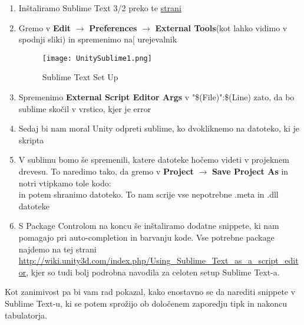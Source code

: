 \begin{enumerate}
	\item Inštaliramo Sublime Text 3/2 preko te \href{http://www.sublimetext.com/3}{strani}
	\item Gremo v \textbf{Edit} $\rightarrow$ \textbf{Preferences} $\rightarrow$ \textbf{External Tools}(kot lahko vidimo v spodnji sliki) in spremenimo na[ urejevalnik\\
	\begin{figure}[h]
  		\centering
		\texttt{[image: UnitySublime1.png]}
		\caption{Sublime Text Set Up}
	\end{figure}
	\item Spremenimo \textbf{External Script Editor Args} v "\$(File)":\$(Line) zato, da bo sublime skočil v vrstico, kjer je error 
	\item Sedaj bi nam moral Unity odpreti sublime, ko dvokliknemo na datoteko, ki je skripta
	\item V sublimu bomo še spremenili, katere datoteke hočemo videti v projeknem drevesu. To naredimo tako, da gremo v \textbf{Project} $\rightarrow$ \textbf{Save Project As} in notri vtipkamo tole kodo:\\
	in potem shranimo datoteko. To nam scrije vse nepotrebne .meta in .dll datoteke
	\item S Package Controlom na koncu še inštaliramo dodatne snippete, ki nam pomagajo pri auto-completion in barvanju kode. Vse potrebne package najdemo na tej strani \url{http://wiki.unity3d.com/index.php/Using_Sublime_Text_as_a_script_editor}, kjer so tudi bolj podrobna navodila za celoten setup Sublime Text-a.
\end{enumerate}
Kot zanimivost pa bi vam rad pokazal, kako enostavno se da narediti snippete v Sublime Text-u, ki se potem sprožijo ob določenem zaporedju tipk in nakoncu tabulatorja. 
